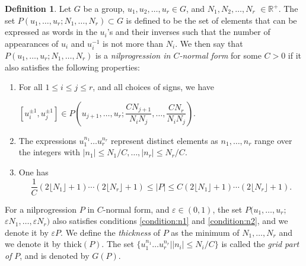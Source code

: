 \documentclass[12pt]{amsart}
\theoremstyle{definition}
\def\fnum{equation}
\newtheorem{definition}[\fnum]{Definition}
\numberwithin{equation}{section}
\newcommand{\thi}{\text{thick}}
\begin{document}
\begin{definition}
  Let $G$ be a group, $u_1, u_2, \ldots , u_r \in G$, and $N_1, N_2, \ldots , N_r $ $\in \mathbb{R}^+$. The set $P(u_1, \ldots , u_r ; N_1, \ldots , N_r) \subset G$ is defined to be the set of elements that can be expressed as words in the $u_i$'s and their inverses such that the number of appearances of $u_i$ and $u_i^{-1}$ is not more than $N_i$.  We then say that  $P(u_1, \ldots , u_r ; N_1, \ldots , N_r)$  is a \emph{nilprogression in $C$-normal form} for some $C>0$ if it also satisfies the following properties:
\begin{enumerate}[1.]
\item  For all $1 \leq i \leq j \leq r$, and all choices of signs, we have
\begin{center}
$  [ u_i^{\pm 1} , u_j^{\pm 1} ]  \in P \left(  u_{j+1} , \ldots , u_r ; \dfrac{CN_{j+1}}{N_iN_j} , \ldots , \dfrac{CN_r}{N_iN_j}  \right). $
\end{center}\label{condition:n1}
\item The expressions $ u_1 ^{n_1} \ldots u_r^{n_r} $ represent distinct  elements as $n_1, \ldots , n_r$ range over the integers with  $\vert n_1 \vert \leq  N_1/C , \ldots , \vert n_r \vert \leq  N_r/C$.\label{condition:n2}
\item One has 
\[  \frac{1}{C} (2\lfloor N_1 \rfloor + 1 ) \cdots ( 2\lfloor N_r \rfloor + 1 ) \leq \vert P \vert  \leq C (2 \lfloor N_1 \rfloor + 1 ) \cdots ( 2\lfloor N_r \rfloor + 1 ) .               \]\label{condition:n3}
\end{enumerate} 
For a nilprogression $P$ in $C$-normal form, and $\varepsilon \in (0,1)$, the set  $P( u_1, \ldots , u_r ; $ $ \varepsilon N_1, \ldots , \varepsilon N_r   )$ also satisfies conditions \eqref{condition:n1} and \eqref{condition:n2}, and we denote it by $\varepsilon P$. We define the \emph{thickness} of $P$ as the minimum of $N_1, \ldots , N_r$ and we denote it by $ \thi (P)$. The set $\{ u_1 ^{n_1 }\ldots u_r^{n_r} \vert \vert n_i \vert \leq N_i/C  \}$ is called the \emph{grid part of }$P$, and is denoted by $G(P)$.
\end{definition}
\end{document}
